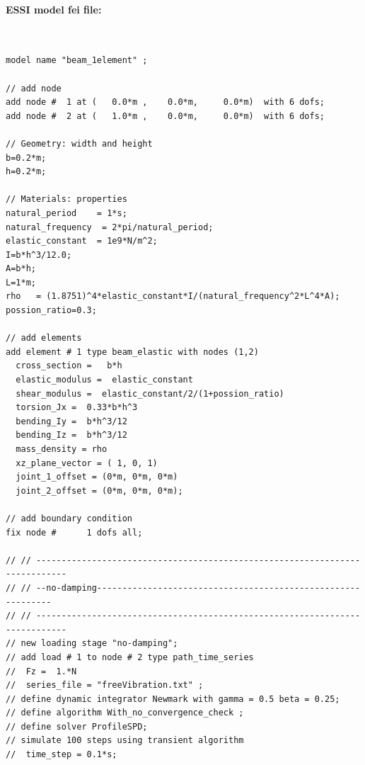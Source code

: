 \documentclass[fleqn,11pt]{article}
\begin{document}
\paragraph{ESSI model fei file: } ~


\begin{lstlisting}
model name "beam_1element" ;

// add node
add node #  1 at (   0.0*m ,    0.0*m,     0.0*m)  with 6 dofs;
add node #  2 at (   1.0*m ,    0.0*m,     0.0*m)  with 6 dofs;
  
// Geometry: width and height
b=0.2*m;
h=0.2*m;

// Materials: properties
natural_period    = 1*s;        
natural_frequency  = 2*pi/natural_period;
elastic_constant  = 1e9*N/m^2; 
I=b*h^3/12.0;
A=b*h;
L=1*m;
rho   = (1.8751)^4*elastic_constant*I/(natural_frequency^2*L^4*A);
possion_ratio=0.3;

// add elements
add element # 1 type beam_elastic with nodes (1,2) 
  cross_section =   b*h 
  elastic_modulus =  elastic_constant
  shear_modulus =  elastic_constant/2/(1+possion_ratio)
  torsion_Jx =  0.33*b*h^3
  bending_Iy =  b*h^3/12
  bending_Iz =  b*h^3/12
  mass_density = rho
  xz_plane_vector = ( 1, 0, 1) 
  joint_1_offset = (0*m, 0*m, 0*m) 
  joint_2_offset = (0*m, 0*m, 0*m);

// add boundary condition
fix node #      1 dofs all;

// // ----------------------------------------------------------------------------
// // --no-damping-------------------------------------------------------------
// // ----------------------------------------------------------------------------
// new loading stage "no-damping";
// add load # 1 to node # 2 type path_time_series 
//  Fz =  1.*N
//  series_file = "freeVibration.txt" ;
// define dynamic integrator Newmark with gamma = 0.5 beta = 0.25;
// define algorithm With_no_convergence_check ;
// define solver ProfileSPD;
// simulate 100 steps using transient algorithm 
//  time_step = 0.1*s;


\end{lstlisting}
\end{document}
